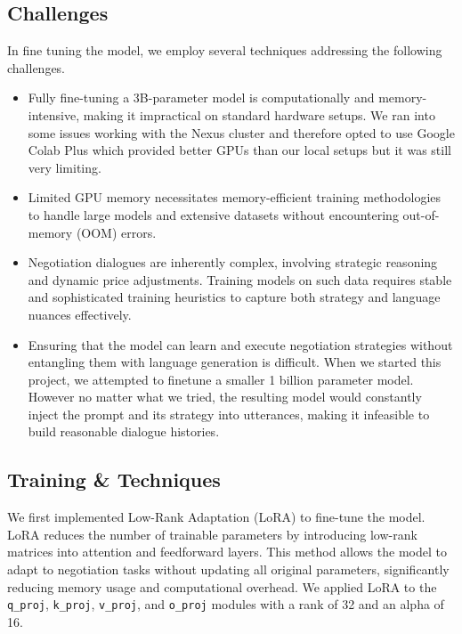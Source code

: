 \documentclass[11pt]{article}
\begin{document}
\subsection{Challenges}
In fine tuning the model, we employ several techniques addressing the following challenges.
\begin{itemize}
    \item Fully fine-tuning a 3B-parameter model is computationally and memory-intensive, making it impractical on standard hardware setups. We ran into some issues working with the Nexus cluster and therefore opted to use Google Colab Plus which provided better GPUs than our local setups but it was still very limiting.

    \item Limited GPU memory necessitates memory-efficient training methodologies to handle large models and extensive datasets without encountering out-of-memory (OOM) errors.

    \item Negotiation dialogues are inherently complex, involving strategic reasoning and dynamic price adjustments. Training models on such data requires stable and sophisticated training heuristics to capture both strategy and language nuances effectively.

    \item Ensuring that the model can learn and execute negotiation strategies without entangling them with language generation is difficult. When we started this project, we attempted to finetune a smaller 1 billion parameter model. However no matter what we tried, the resulting model would constantly inject the prompt and its strategy into utterances, making it infeasible to build reasonable dialogue histories.
\end{itemize}


\subsection{Training \& Techniques}
We first implemented Low-Rank Adaptation (LoRA) to fine-tune the model. LoRA reduces the number of trainable parameters by introducing low-rank matrices into attention and feedforward layers. This method allows the model to adapt to negotiation tasks without updating all original parameters, significantly reducing memory usage and computational overhead.  We applied LoRA to the \texttt{q\_proj}, \texttt{k\_proj}, \texttt{v\_proj}, and \texttt{o\_proj} modules with a rank of 32 and an alpha of 16.
\end{document}

